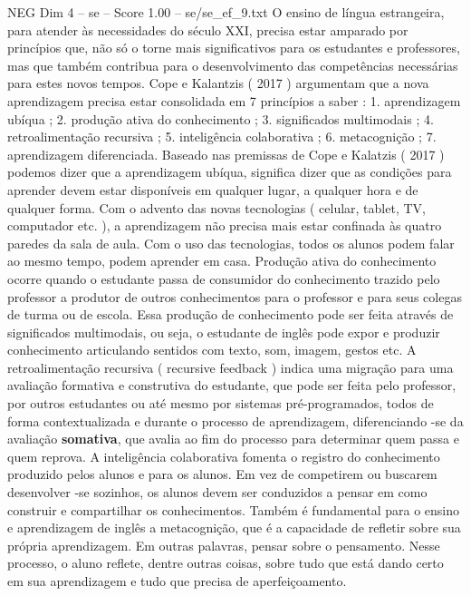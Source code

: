 \begin{textsample}{NEG Dim 4 – se – Score 1.00 – se/se\_ef\_9.txt}  \label{ex:f4_neg_148}
O ensino de língua estrangeira, para atender às necessidades do século XXI, precisa estar amparado por princípios que, não só o torne mais significativos para os estudantes e professores, mas que também contribua para o desenvolvimento das competências necessárias para estes novos tempos.
Cope e Kalantzis ( 2017 ) argumentam que a nova aprendizagem precisa estar consolidada em 7 princípios a saber : 1. aprendizagem ubíqua ; 2. produção ativa do conhecimento ; 3. significados multimodais ; 4. retroalimentação recursiva ; 5. inteligência colaborativa ; 6. metacognição ; 7. aprendizagem diferenciada.
Baseado nas premissas de Cope e Kalatzis ( 2017 ) podemos dizer que a aprendizagem ubíqua, significa dizer que as condições para aprender devem estar disponíveis em qualquer lugar, a qualquer hora e de qualquer forma.
Com o advento das novas tecnologias ( celular, tablet, TV, computador etc. ), a aprendizagem não precisa mais estar confinada às quatro paredes da sala de aula.
Com o uso das tecnologias, todos os alunos podem falar ao mesmo tempo, podem aprender em casa.
Produção ativa do conhecimento ocorre quando o estudante passa de consumidor do conhecimento trazido pelo professor a produtor de outros conhecimentos para o professor e para seus colegas de turma ou de escola.
Essa produção de conhecimento pode ser feita através de significados multimodais, ou seja, o estudante de inglês pode expor e produzir conhecimento articulando sentidos com texto, som, imagem, gestos etc.
A retroalimentação recursiva ( recursive feedback ) indica uma migração para uma avaliação formativa e construtiva do estudante, que pode ser feita pelo professor, por outros estudantes ou até mesmo por sistemas pré-programados, todos de forma contextualizada e durante o processo de aprendizagem, diferenciando -se da avaliação \textbf{somativa}, que avalia ao fim do processo para determinar quem passa e quem reprova.
A inteligência colaborativa fomenta o registro do conhecimento produzido pelos alunos e para os alunos.
Em vez de competirem ou buscarem desenvolver -se sozinhos, os alunos devem ser conduzidos a pensar em como construir e compartilhar os conhecimentos.
Também é fundamental para o ensino e aprendizagem de inglês a metacognição, que é a capacidade de refletir sobre sua própria aprendizagem.
Em outras palavras, pensar sobre o pensamento.
Nesse processo, o aluno reflete, dentre outras coisas, sobre tudo que está dando certo em sua aprendizagem e tudo que precisa de aperfeiçoamento.

\end{textsample}
